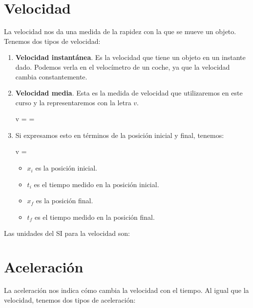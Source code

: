 \section{Velocidad}

La velocidad nos da una medida de la rapidez con la que se mueve un objeto.
Tenemos dos tipos de velocidad:

\begin{enumerate}[label=\numberballmDarkTeal]
        \item \textbf{Velocidad instantánea}.
        Es la velocidad que tiene un objeto en un instante dado.
        Podemos verla en el velocímetro de un coche, ya que la velocidad cambia constantemente.

        \item \textbf{Velocidad media}.
        Esta es la medida de velocidad que utilizaremos en este curso y la representaremos con la letra \( v \).
        \begin{centeredequation}
            v =  = 
        \end{centeredequation}

        \item Si expresamos esto en términos de la posición inicial y final, tenemos:
        \begin{centeredequation}
            v = 
        \end{centeredequation}
        \begin{itemize}
            \item \( x_i \) es la posición inicial.
            \item \( t_i \) es el tiempo medido en la posición inicial.
            \item \( x_f \) es la posición final.
            \item \( t_f \) es el tiempo medido en la posición final.
        \end{itemize}
\end{enumerate}

Las unidades del SI para la velocidad son: \unit{\mps}


\section{Aceleración}

La aceleración nos indica cómo cambia la velocidad con el tiempo.
Al igual que la velocidad, tenemos dos tipos de aceleración:

